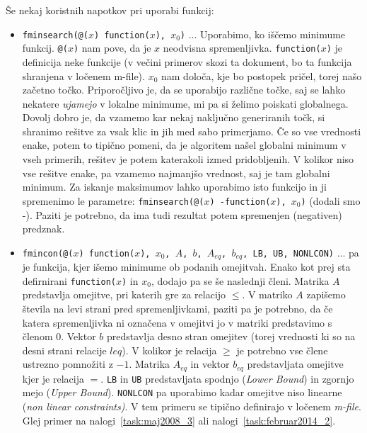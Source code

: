 \documentclass[a4paper,11pt]{article}
\begin{document}
Še nekaj koristnih napotkov pri uporabi funkcij:
\begin{itemize}
	\item \texttt{fminsearch(@($x$) function($x$), $x_0$)} ... Uporabimo, ko iščemo minimume funkcij. \texttt{@($x$)} nam pove, da je $x$ neodvisna spremenljivka. \texttt{function($x$)} je definicija neke funkcije (v večini primerov skozi ta dokument, bo ta funkcija shranjena v ločenem m-file). $x_0$ nam določa, kje bo postopek pričel, torej našo začetno točko. Priporočljivo je, da se uporabijo različne točke, saj se lahko nekatere \textit{ujamejo} v lokalne minimume, mi pa si želimo poiskati globalnega. Dovolj dobro je, da vzamemo kar nekaj naključno generiranih točk, si shranimo rešitve za vsak klic in jih med sabo primerjamo. Če so vse vrednosti enake, potem to tipično pomeni, da je algoritem našel globalni minimum v vseh primerih, rešitev je potem katerakoli izmed pridobljenih. V kolikor niso vse rešitve enake, pa vzamemo najmanjšo vrednost, saj je tam globalni minimum. Za iskanje maksimumov lahko uporabimo isto funkcijo in ji spremenimo le parametre: \texttt{fminsearch(@($x$) -function($x$), $x_0$)} (dodali smo -). Paziti je potrebno, da ima tudi rezultat potem spremenjen (negativen) predznak.
	
	\item \texttt{fmincon(@($x$) function($x$), $x_0$, $A$, $b$, $A_{eq}$, $b_{eq}$, LB, UB, NONLCON)} ... pa je funkcija, kjer išemo minimume ob podanih omejitvah. Enako kot prej sta defirnirani \texttt{function($x$)} in $x_0$, dodajo pa se še naslednji členi. Matrika $A$ predstavlja omejitve, pri katerih gre za relacijo $\leq$. V matriko $A$ zapišemo števila na levi strani pred spremenljivkami, paziti pa je potrebno, da če katera spremenljivka ni označena v omejitvi jo v matriki predstavimo s členom 0. Vektor $b$ predstavlja desno stran omejitev (torej vrednosti ki so na desni strani relacije $leq$). V kolikor je relacija $\geq$ je potrebno vse člene ustrezno pomnožiti z $-1$. Matrika $A_{eq}$ in vektor $b_{eq}$ predstavljata omejitve kjer je relacija $=$. \texttt{LB} in \texttt{UB} predstavljata spodnjo (\textit{Lower Bound}) in zgornjo mejo (\textit{Upper Bound}). \texttt{NONLCON} pa uporabimo kadar omejitve niso linearne (\textit{non linear constraints)}. V tem primeru se tipično definirajo v ločenem \textit{m-file}. Glej primer na nalogi~\ref{task:maj2008_3} ali nalogi~\ref{task:februar2014_2}.
	
\end{itemize}
\end{document}
